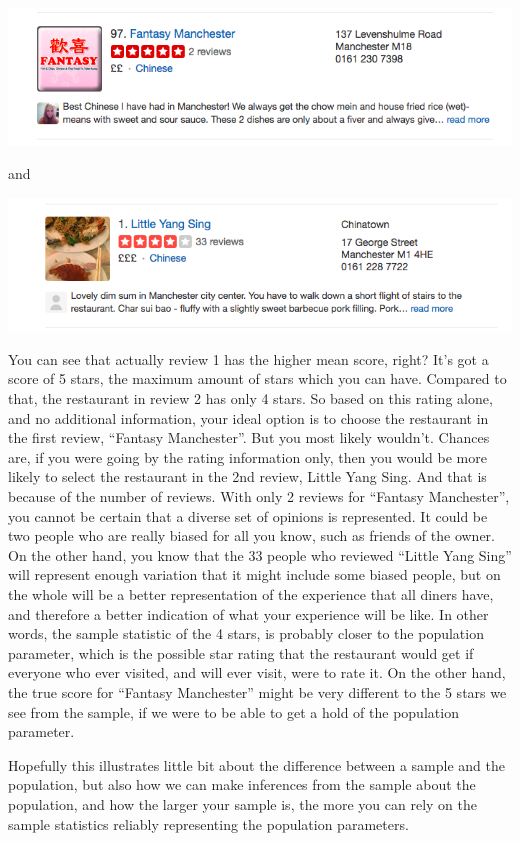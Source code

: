 \documentclass[]{book}
\theoremstyle{definition}
\theoremstyle{definition}
\theoremstyle{definition}
\theoremstyle{remark}
\begin{document}
\includegraphics{imgs/review_1.png}

and

\includegraphics{imgs/review_2.png}

You can see that actually review 1 has the higher mean score, right?
It's got a score of 5 stars, the maximum amount of stars which you can
have. Compared to that, the restaurant in review 2 has only 4 stars. So
based on this rating alone, and no additional information, your ideal
option is to choose the restaurant in the first review, ``Fantasy
Manchester''. But you most likely wouldn't. Chances are, if you were
going by the rating information only, then you would be more likely to
select the restaurant in the 2nd review, Little Yang Sing. And that is
because of the number of reviews. With only 2 reviews for ``Fantasy
Manchester'', you cannot be certain that a diverse set of opinions is
represented. It could be two people who are really biased for all you
know, such as friends of the owner. On the other hand, you know that the
33 people who reviewed ``Little Yang Sing'' will represent enough
variation that it might include some biased people, but on the whole
will be a better representation of the experience that all diners have,
and therefore a better indication of what your experience will be like.
In other words, the sample statistic of the 4 stars, is probably closer
to the population parameter, which is the possible star rating that the
restaurant would get if everyone who ever visited, and will ever visit,
were to rate it. On the other hand, the true score for ``Fantasy
Manchester'' might be very different to the 5 stars we see from the
sample, if we were to be able to get a hold of the population parameter.

Hopefully this illustrates little bit about the difference between a
sample and the population, but also how we can make inferences from the
sample about the population, and how the larger your sample is, the more
you can rely on the sample statistics reliably representing the
population parameters.
\end{document}

